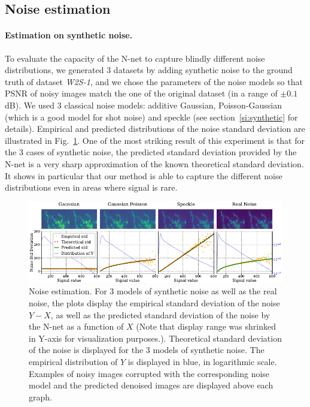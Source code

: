 \documentclass{article}
\begin{document}
\subsection{Noise estimation}

\paragraph{Estimation on synthetic noise.}
To evaluate the capacity of the N-net to capture blindly different noise distributions, we generated 3 datasets by adding synthetic noise to the ground truth of dataset \textit{W2S-1}, and we chose the parameters of the noise models so that PSNR of noisy images match the one of the original dataset (in a range of $\pm0.1$dB).
We used 3 classical noise models: additive Gaussian, Poisson-Gaussian (which is a good model for shot noise) and speckle (see section~\ref{si:synthetic} for details).
Empirical and predicted distributions of the noise standard deviation are illustrated in Fig.~\ref{fig:noisestd}.
One of the most striking result of this experiment is that for the 3 cases of synthetic noise, the predicted standard deviation provided by the N-net is a very sharp approximation of the known theoretical standard deviation.
It shows in particular that our method is able to capture the different noise distributions even in areas where signal is rare.
\begin{figure}[!htbp]
\vskip -0.1in
\begin{center}
\centerline{\includegraphics[width=\textwidth]{fig_noise_std_1col.pdf}}
\caption[Noise estimation]{Noise estimation.
For 3 models of synthetic noise as well as the real noise, the plots display the empirical standard deviation of the noise $Y - X$, as well as the predicted standard deviation of the noise by the N-net as a function of $X$ (Note that display range was shrinked in Y-axis for visualization purposes.).
Theoretical standard deviation of the noise is displayed for the 3 models of synthetic noise.
The empirical distribution of $Y$ is displayed in blue, in logarithmic scale.
Examples of noisy images corrupted with the corresponding noise model and the predicted denoised images are displayed above each graph.}
\label{fig:noisestd}
\end{center}
\end{figure}
\end{document}
